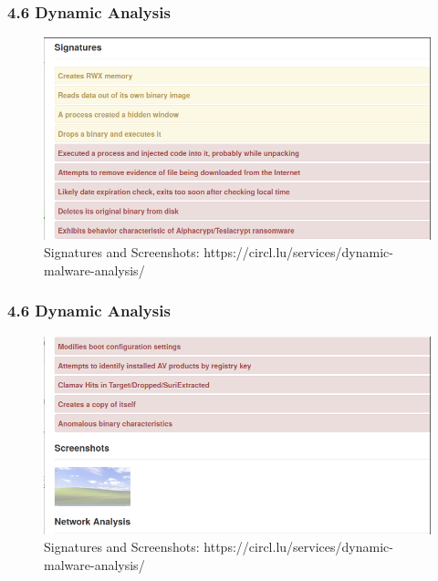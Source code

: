 \begin{frame}[fragile]
  \frametitle{4.6 Dynamic Analysis}
    \begin{figure}
        \includegraphics[scale=0.4]{images/dma_2a.png}
        \captionsetup{labelformat=empty,labelsep=none}
        \caption[]{\tiny Signatures and Screenshots: https://circl.lu/services/dynamic-malware-analysis/}
    \end{figure}
\end{frame}


\begin{frame}[fragile]
  \frametitle{4.6 Dynamic Analysis}
    \begin{figure}
        \includegraphics[scale=0.4]{images/dma_2b.png}
        \captionsetup{labelformat=empty,labelsep=none}
        \caption[]{\tiny Signatures and Screenshots: https://circl.lu/services/dynamic-malware-analysis/}
    \end{figure}
\end{frame}


